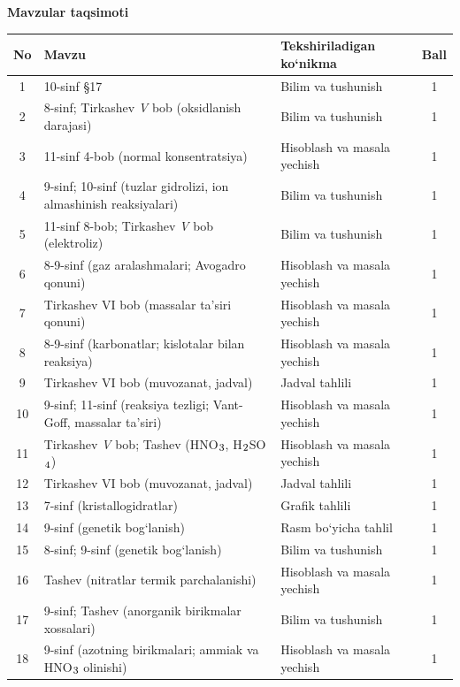 \documentclass[11pt,a4paper]{article}
\renewcommand{\textsubscript}[1]{\ensuremath{_{\text{\fontsize{8}{8}\selectfont #1}}}}
\begin{document}
\par\bigskip\noindent\textbf{Mavzular taqsimoti}\par\smallskip
{\small\noindent\begin{longtable}{|c|p{7.2cm}|p{5.4cm}|c|}\hline \textbf{No} & \textbf{Mavzu} & \textbf{Tekshiriladigan ko`nikma} & \textbf{Ball}\\\hline
1 & 10-sinf \S{}17 & Bilim va tushunish & 1\\\hline
2 & 8-sinf; Tirkashev \textit{V} bob (oksidlanish darajasi) & Bilim va tushunish & 1\\\hline
3 & 11-sinf 4-bob (normal konsentratsiya) & Hisoblash va masala yechish & 1\\\hline
4 & 9-sinf; 10-sinf (tuzlar gidrolizi, ion almashinish reaksiyalari) & Bilim va tushunish & 1\\\hline
5 & 11-sinf 8-bob; Tirkashev \textit{V} bob (elektroliz) & Bilim va tushunish & 1\\\hline
6 & 8-9-sinf (gaz aralashmalari; Avogadro qonuni) & Hisoblash va masala yechish & 1\\\hline
7 & Tirkashev VI bob (massalar ta'siri qonuni) & Hisoblash va masala yechish & 1\\\hline
8 & 8-9-sinf (karbonatlar; kislotalar bilan reaksiya) & Hisoblash va masala yechish & 1\\\hline
9 & Tirkashev VI bob (muvozanat, jadval) & Jadval tahlili & 1\\\hline
10 & 9-sinf; 11-sinf (reaksiya tezligi; Vant-Goff, massalar ta'siri) & Hisoblash va masala yechish & 1\\\hline
11 & Tirkashev \textit{V} bob; Tashev (HNO\textsubscript{3}, H\textsubscript{2}SO\textsubscript{4}) & Hisoblash va masala yechish & 1\\\hline
12 & Tirkashev VI bob (muvozanat, jadval) & Jadval tahlili & 1\\\hline
13 & 7-sinf (kristallogidratlar) & Grafik tahlili & 1\\\hline
14 & 9-sinf (genetik bog`lanish) & Rasm bo`yicha tahlil & 1\\\hline
15 & 8-sinf; 9-sinf (genetik bog`lanish) & Bilim va tushunish & 1\\\hline
16 & Tashev (nitratlar termik parchalanishi) & Hisoblash va masala yechish & 1\\\hline
17 & 9-sinf; Tashev (anorganik birikmalar xossalari) & Bilim va tushunish & 1\\\hline
18 & 9-sinf (azotning birikmalari; ammiak va HNO\textsubscript{3} olinishi) & Hisoblash va masala yechish & 1\\\hline

\end{longtable}}
\end{document}
